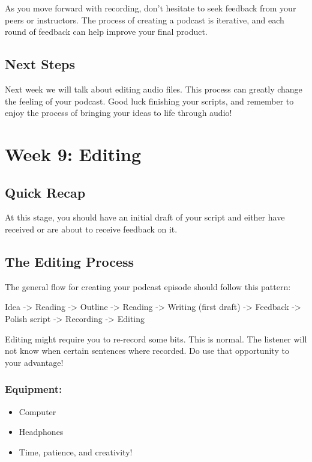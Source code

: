 \documentclass[
  letterpaper,
  DIV=11,
  numbers=noendperiod]{scrreprt}
\providecommand{\tightlist}{%
  \setlength{\itemsep}{0pt}\setlength{\parskip}{0pt}}\usepackage{longtable,booktabs,array}
\begin{document}
As you move forward with recording, don't hesitate to seek feedback from
your peers or instructors. The process of creating a podcast is
iterative, and each round of feedback can help improve your final
product.

\section{Next Steps}\label{next-steps-8}

Next week we will talk about editing audio files. This process can
greatly change the feeling of your podcast. Good luck finishing your
scripts, and remember to enjoy the process of bringing your ideas to
life through audio!

\chapter{Week 9: Editing}\label{week-9-editing}

\section{Quick Recap}\label{quick-recap-3}

At this stage, you should have an initial draft of your script and
either have received or are about to receive feedback on it.

\section{The Editing Process}\label{the-editing-process}

The general flow for creating your podcast episode should follow this
pattern:

Idea -\textgreater{} Reading -\textgreater{} Outline -\textgreater{}
Reading -\textgreater{} Writing (first draft) -\textgreater{} Feedback
-\textgreater{} Polish script -\textgreater{} Recording -\textgreater{}
Editing

Editing might require you to re-record some bits. This is normal. The
listener will not know when certain sentences where recorded. Do use
that opportunity to your advantage!

\subsection{Equipment:}\label{equipment-1}

\begin{itemize}
\tightlist
\item
  Computer
\item
  Headphones
\item
  Time, patience, and creativity!
\end{itemize}
\end{document}
